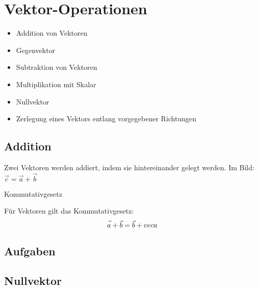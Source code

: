 \section{Vektor-Operationen}

\begin{itemize}
\item Addition von Vektoren
\item Gegenvektor
\item Subtraktion von Vektoren
\item Multiplikation mit Skalar
\item Nullvektor
\item Zerlegung eines Vektors entlang vorgegebener Richtungen
\end{itemize}

\newpage

\subsection{Addition}

Zwei Vektoren werden addiert, indem sie hintereinander gelegt
werden. Im Bild: $\vec{c} = \vec{a} + \vec{b}$


\begin{gesetz}{Kommutativgesetz}{}

  Für Vektoren gilt das Kommutativgesetz:
  $$\vec{a\vphantom{b}} + \vec{b} = \vec{b} + vec{a\vphantom{b}}$$
  \end{gesetz}

\subsection*{Aufgaben}



\newpage

\subsection{Nullvektor}

